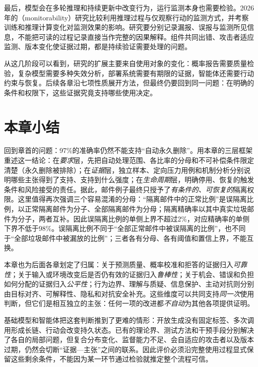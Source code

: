 最后，模型会在多轮推理和持续更新中改变行为，运行监测本身也需要检验。2026年的（monitorability）研究比较利用推理过程与仅观察行动的监测方式，并考察训练和推理计算变化对监测效果的影响。研究要分别记录漏报、误报与监测所见信息，不能把可读的过程记录直接当作完整的因果解释。组件共同出错、攻击者适应监测、版本变化使证据过期，都是持续验证需要处理的问题。

从这几阶段可以看到，研究的扩展主要来自使用对象的变化：概率报告需要质量检验，复杂模型需要多种失效分析，部署系统需要有期限的证据，智能体还需要行动约束与恢复。后续各章沿七项性质展开方法，但最终仍要回到同一问题：在明确的条件和权限下，这些证据究竟支持哪些使用决定。

\section{本章小结}
\label{sec:trust-foundations-summary}

回到章首的问题：97\%的准确率仍然不能支持“自动永久删除”。用本章的三层框架重述这一结论：在\emph{要求}层，先把自动处理范围、各比率的分母和不可补偿条件限定清楚（永久删除被排除）；在\emph{证据}层，独立样本、定向压力用例和机制分析分别说明哪些主张得到了支持、支持到什么强度；在\emph{生命周期}层，明确停用、恢复的触发条件和风险接受的责任。据此，邮件例子最终只授予了\emph{有条件的、可恢复的}隔离权限。这里值得再次强调三个容易混淆的分母：“隔离邮件中的正常比例”是误隔离比例，以正常隔离邮件为分子、全部隔离邮件为分母；隔离精确率以其中真实垃圾邮件为分子，两者互补。因此误隔离比例的单侧上界不超过2\%，对应精确率的单侧下界不低于98\%。误隔离比例不同于“全部正常邮件中被误隔离的比例”，也不同于“全部垃圾邮件中被漏放的比例”；三者各有分母、各有阈值和置信上界，不能互换。

本章也为后面各章划定了归属：关于预测质量、概率校准和拒答的证据归入\emph{可靠性}；关于输入或环境改变后是否仍有效的证据归入\emph{鲁棒性}；关于机会、错误和负担如何分配的证据归入\emph{公平性}；行为边界、理解与质疑、信息保护、主动对抗则分别由目标对齐、可解释性、隐私和对抗安全补充。这些维度可以共同支持\emph{同一次}使用判断，但它们是相互独立的主张：任何一项的改进都\emph{不自动}为其他各项提供证明。

基础模型和智能体把这套判断推到了更难的情形：开放生成没有固定标签、多次调用形成长链、行动会改变持久状态。已有的理论界、测试方法和干预手段分别解决了各自的局部问题，但复合分布变化、监督能力不足、会自适应的攻击者以及版本过期，仍然会切断“证据—主张”之间的联系。因此评价必须沿完整使用过程显式保留这些剩余条件，不能因为某一环节通过检验就推定整个流程可信。

